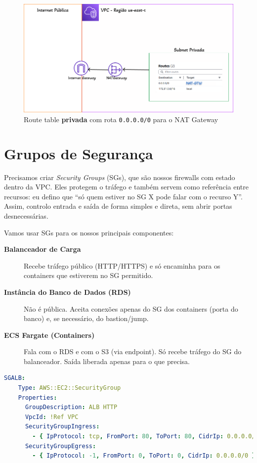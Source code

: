 \begin{figure}[H]
\centering
\caption{Route table \textbf{privada} com rota \texttt{0.0.0.0/0} para o NAT Gateway}
\label{fig:rt-privada}
\includegraphics[scale=0.5]{imagens/SubnetPrivada.png}
\end{figure}


\section{Grupos de Segurança}
Precisamos criar \textit{Security Groups} (SGs), que são nossos firewalls com estado dentro da VPC. Eles protegem o tráfego e também servem como referência entre recursos: eu defino que “só quem estiver no SG X pode falar com o recurso Y”. Assim, controlo entrada e saída de forma simples e direta, sem abrir portas desnecessárias.

Vamos usar SGs para os nossos principais componentes:

\begin{description}
  \item[\textbf{Balanceador de Carga}] Recebe tráfego público (HTTP/HTTPS) e só encaminha para os containers que estiverem no SG permitido.
  \item[\textbf{Instância do Banco de Dados (RDS)}] Não é pública. Aceita conexões apenas do SG dos containers (porta do banco) e, se necessário, do bastion/jump.
  \item[\textbf{ECS Fargate (Containers)}] Fala com o RDS e com o S3 (via endpoint). Só recebe tráfego do SG do balanceador. Saída liberada apenas para o que precisa.
\end{description}

\begin{lstlisting}[language=YAML, float=htbp]
SGALB:
    Type: AWS::EC2::SecurityGroup
    Properties:
      GroupDescription: ALB HTTP
      VpcId: !Ref VPC
      SecurityGroupIngress:
        - { IpProtocol: tcp, FromPort: 80, ToPort: 80, CidrIp: 0.0.0.0/0 }
      SecurityGroupEgress:
        - { IpProtocol: -1, FromPort: 0, ToPort: 0, CidrIp: 0.0.0.0/0 }
\end{lstlisting}

